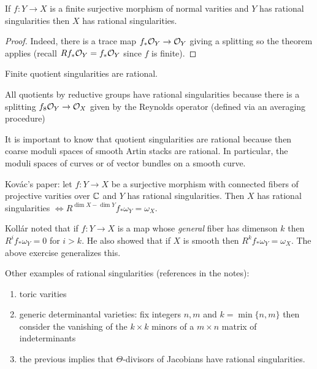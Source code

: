 \documentclass[12pt]{article}
\begin{document}
\begin{cor}
If $f : Y \to X$ is a finite surjective morphism of normal varities and $Y$ has rational singularities then $X$ has rational singularities.
\end{cor}

\begin{proof}
Indeed, there is a trace map $f_* \mathcal{O}_{Y} \to \mathcal{O}_{Y}$ giving a splitting so the theorem applies (recall $R f_* \mathcal{O}_{Y} = f_* \mathcal{O}_{Y}$ since $f$ is finite).
\end{proof}

\begin{cor}
Finite quotient singularities are rational. 
\end{cor}

\begin{example}
All quotients by reductive groups have rational singularities because there is a splitting $f_8 \mathcal{O}_{Y} \to \mathcal{O}_{X}$ given by the Reynolds operator (defined via an averaging procedure)
\end{example}

It is important to know that quotient singularities are rational because then coarse moduli spaces of smooth Artin stacks are rational. In particular, the moduli spaces of curves or of vector bundles on a smooth curve. 

\begin{exercise}
Kov\'{a}c's paper: let $f : Y \to X$ be a surjective morphism with connected fibers of projective varities over $\mathbb{C}$ and $Y$ has rational singularities. Then $X$ has rational singularities $\iff R^{\dim{X} - \dim{Y}} f_* \omega_Y = \omega_X$.
\end{exercise}

Koll\'{a}r noted that if $f : Y \to X$ is a map whose \textit{general} fiber has dimenson $k$ then $R^i f_* \omega_Y = 0$ for $i > k$. He also showed that if $X$ is smooth then $R^k f_* \omega_Y = \omega_X$. The above exercise generalizes this. 

\begin{exercise}
Other examples of rational singularities (references in the notes):
\begin{enumerate}
\item toric varities
\item generic determinantal varieties: fix integers $n,m$ and $k = \min \{ n, m \}$ then consider the vanishing of the $k \times k$ minors of a $m \times n$ matrix of indeterminants
\item the previous implies that $\Theta$-divisors of Jacobians have rational singularities.
\end{enumerate}
\end{exercise}
\end{document}
